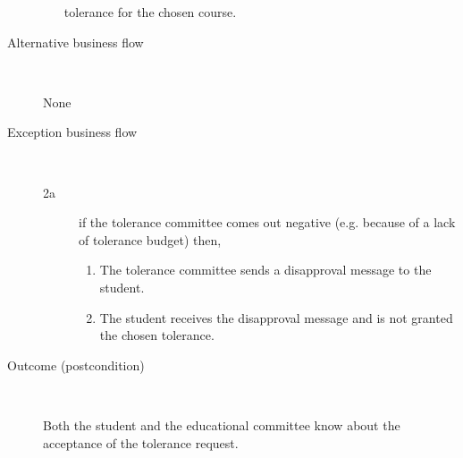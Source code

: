 \begin{description}
\begin{enumerate}
	  	tolerance for the chosen course.
	\end{enumerate}
	\item[Alternative business flow] \ 
		\par None
	\item[Exception business flow] \ 
	\begin{description}
		\item[2a] if the tolerance committee comes out negative (e.g. because of a
		lack of tolerance budget) then,
		\begin{enumerate}
		  \item The tolerance committee sends a disapproval message to the student.
		  \item The student receives the disapproval message and is not granted the
		  chosen tolerance.
		\end{enumerate}
	\end{description}
	\item[Outcome (postcondition)] \ 
		\par Both the student and the educational committee know about the acceptance
		of the tolerance request.
\end{description}
